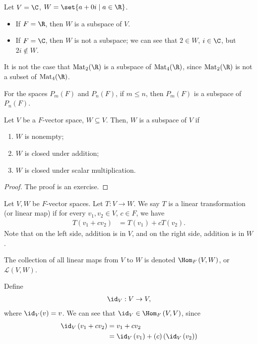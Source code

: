 \documentclass[10pt]{mypackage}
\begin{document}
\begin{example}[Subspaces of $\C$]
  Let $V = \C$, $W = \set{a + 0i\mid a\in \R}$.
  \begin{itemize}
    \item If $F = \R$, then $W$ is a subspace of $V$.
    \item If $F = \C$, then $W$ is not a subspace; we can see that $2\in W$, $i\in \C$, but $2i\notin W$.
  \end{itemize}
\end{example}
\begin{example}[Matrices]
  It is not the case that $\text{Mat}_2(\R)$ is a subspace of $\text{Mat}_4(\R)$, since $\text{Mat}_2(\R)$ is not a subset of $\text{Mat}_4(\R)$.
\end{example}
\begin{example}[Polynomials]
  For the spaces $P_{m}(F)$ and $P_{n}\left(F\right)$, if $m \leq n$, then $P_{m}\left(F\right)$ is a subspace of $P_{n}\left(F\right)$.
\end{example}
\begin{lemma}
  Let $V$ be a $F$-vector space, $W\subseteq V$. Then, $W$ is a subspace of $V$ if
  \begin{enumerate}[(1)]
    \item $W$ is nonempty;
    \item $W$ is closed under addition;
    \item $W$ is closed under scalar multiplication.
  \end{enumerate}
\end{lemma}
\begin{proof}
  The proof is an exercise.
\end{proof}
\begin{definition}
  Let $V,W$ be $F$-vector spaces. Let $T: V\rightarrow W$. We say $T$ is a linear transformation (or linear map) if for every $v_1,v_2\in V$, $c\in F$, we have
  \begin{align*}
    T\left(v_1 + cv_2\right) &= T\left(v_1\right) + cT\left(v_2\right).
  \end{align*}
  Note that on the left side, addition is in $V$, and on the right side, addition is in $W$.\newline

  The collection of all linear maps from $V$ to $W$ is denoted $\Hom_{F}\left(V,W\right)$, or $\mathcal{L}\left(V,W\right)$.
\end{definition}
\begin{example}
  Define
  \begin{align*}
    \id_{V}: V\rightarrow V,
  \end{align*}
  where $\id_V(v) = v$. We can see that $\id_V \in \Hom_{F}\left(V,V\right)$, since
  \begin{align*}
    \id_V\left(v_1 + cv_2\right) &= v_1 + cv_2\\
                            &= \id_V\left(v_1\right) + (c)\left(\id_{V}\left(v_2\right)\right)
  \end{align*}
\end{example}
\end{document}
